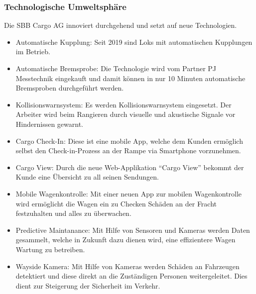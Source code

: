 \documentclass{article}
\begin{document}
\subsubsection{Technologische Umweltsphäre}

Die SBB Cargo AG innoviert durchgehend und setzt auf neue Technologien.
\begin{itemize}
    \item Automatische Kupplung: Seit 2019 sind Loks mit automatischen Kupplungen im Betrieb.
    \item Automatische Bremsprobe: Die Technologie wird vom Partner PJ Messtechnik eingekauft und damit können in nur 10 Minuten automatische Bremsproben durchgeführt werden.
    \item Kollisionswarnsystem: Es werden Kollisionswarnsystem eingesetzt. Der Arbeiter wird beim Rangieren durch visuelle und akustische Signale vor Hindernissen gewarnt.
    \item Cargo Check-In: Diese ist eine mobile App, welche dem Kunden ermöglich selbst den Check-in-Prozess an der Rampe via Smartphone vorzunehmen.
    \item Cargo View: Durch die neue Web-Applikation “Cargo View” bekommt der Kunde eine Übersicht zu all seinen Sendungen.
    \item Mobile Wagenkontrolle: Mit einer neuen App zur mobilen Wagenkontrolle wird ermöglicht die Wagen ein zu Checken Schäden an der Fracht festzuhalten und alles zu überwachen.
    \item Predictive Maintanance: Mit Hilfe von Sensoren und Kameras werden Daten gesammelt, welche in Zukunft dazu dienen wird, eine effizientere Wagen Wartung zu betreiben.
    \item Wayside Kamera: Mit Hilfe von Kameras werden Schäden an Fahrzeugen detektiert und diese direkt an die Zuständigen Personen weitergeleitet. Dies dient zur Steigerung der Sicherheit im Verkehr.
\end{itemize}
\end{document}

